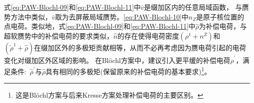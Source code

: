 式\eqref{eq:PAW-Blochl-09}和\eqref{eq:PAW-Blochl-11}中$\bar v$是缀加区内的任意局域函数，%
与赝势方法中类似，$\bar v$取为去屏蔽局域赝势。\eqref{eq:PAW-Blochl-10}中$n_Z$是原子核位置的点电荷。类似地，式\eqref{eq:PAW-Blochl-09}和\eqref{eq:PAW-Blochl-11}中$\hat\rho$为补偿电荷，与超软赝势中的补偿电荷的要求类似，$\hat n$的存在使得电荷密度$(\rho^1+n^Z)$和$(\tilde\rho^1+\hat\rho)$在缀加区外的多极矩贡献相等，从而不必再考虑因为赝电荷引起的电荷变化对缀加区外区域的影响。%
在\textrm{Bl\"ochl}方案中，建议引入更平缓的补偿电荷$\hat\rho^{\prime}$，满足条件:~$\hat\rho^{\prime}$与$\hat\rho$具有相同的多极矩(保留原来的补偿电荷的基本要求)\footnote{这是\textrm{Bl\"ochl}方案与后来\textrm{Kresse}方案处理补偿电荷的主要区别。}。
